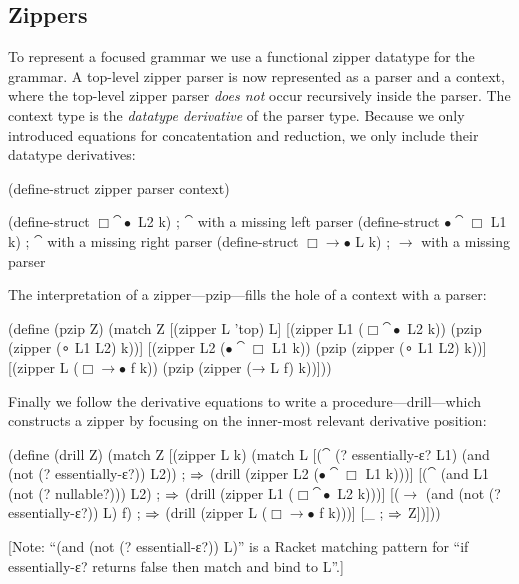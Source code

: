 \subsection{Zippers}
To represent a focused grammar we use a functional zipper datatype for the
grammar.
%
A top-level zipper parser is now represented as a parser and a context, where
the top-level zipper parser \emph{does not} occur recursively inside the
parser.
%
The context type is the \emph{datatype derivative} of the parser type.
%
Because we only introduced equations for concatentation and reduction, we only
include their datatype derivatives:
%
\begin{code}
(define-struct zipper {parser context})
  
(define-struct \(\Box\cat\bullet\) {L2 k}) ; \(\cat\) with a missing left parser
(define-struct \(\bullet\cat\Box\) {L1 k}) ; \(\cat\) with a missing right parser
(define-struct \(\Box\to\bullet\) {L k})  ; \(\to\) with a missing parser
\end{code}

The interpretation of a zipper---pzip---fills the hole of a context with a
parser:
\begin{code}
(define (pzip Z)
  (match Z
    [(zipper L 'top)           L]
    [(zipper L1 (\(\Box\cat\bullet\) L2 k))  (pzip (zipper (∘ L1 L2) k))]
    [(zipper L2 (\(\bullet\cat\Box\) L1 k))  (pzip (zipper (∘ L1 L2) k))]
    [(zipper L (\(\Box\to\bullet\) f k))   (pzip (zipper (→ L f) k))]))
\end{code}

Finally we follow the derivative equations to write a procedure---drill---which
constructs a zipper by focusing on the inner-most relevant derivative
position:
\begin{code}
(define (drill Z)
  (match Z
    [(zipper L k)
     (match L
       [(\(\cat\) (? essentially-ε? L1) 
           (and (not (? essentially-ε?)) L2)) 
        ; \(\mathrel{\Rightarrow}\)
        (drill (zipper L2 (\(\bullet\cat\Box\) L1 k)))]
       [(\(\cat\) (and L1 (not (? nullable?))) L2) 
        ; \(\mathrel{\Rightarrow}\)
        (drill (zipper L1 (\(\Box\cat\bullet\) L2 k)))]
       [(\(\to\) (and (not (? essentially-ε?)) L) f) 
        ; \(\mathrel{\Rightarrow}\)
        (drill (zipper L (\(\Box\to\bullet\) f k)))]
       [_                                            
        ; \(\mathrel{\Rightarrow}\)
        Z])]))
\end{code}
%
[Note: ``(and (not (? essentiall-ε?)) L)'' is a Racket matching pattern for
``if essentially-ε? returns false then match and bind to L''.]
 
